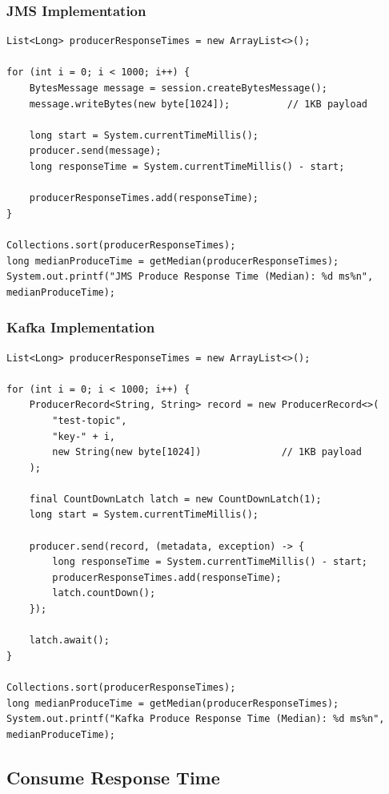 \documentclass[11pt,a4paper]{article}
\begin{document}
\subsubsection{JMS Implementation}
\begin{lstlisting}[style=javastyle, caption=JMS Producer Response Time Test]
List<Long> producerResponseTimes = new ArrayList<>();

for (int i = 0; i < 1000; i++) {
    BytesMessage message = session.createBytesMessage();
    message.writeBytes(new byte[1024]);          // 1KB payload
    
    long start = System.currentTimeMillis();
    producer.send(message);
    long responseTime = System.currentTimeMillis() - start;
    
    producerResponseTimes.add(responseTime);
}

Collections.sort(producerResponseTimes);
long medianProduceTime = getMedian(producerResponseTimes);
System.out.printf("JMS Produce Response Time (Median): %d ms%n", medianProduceTime);
\end{lstlisting}

\subsubsection{Kafka Implementation}
\begin{lstlisting}[style=javastyle, caption=Kafka Producer Response Time Test]
List<Long> producerResponseTimes = new ArrayList<>();

for (int i = 0; i < 1000; i++) {
    ProducerRecord<String, String> record = new ProducerRecord<>(
        "test-topic",
        "key-" + i,
        new String(new byte[1024])              // 1KB payload
    );
    
    final CountDownLatch latch = new CountDownLatch(1);
    long start = System.currentTimeMillis();
    
    producer.send(record, (metadata, exception) -> {
        long responseTime = System.currentTimeMillis() - start;
        producerResponseTimes.add(responseTime);
        latch.countDown();
    });
    
    latch.await();
}

Collections.sort(producerResponseTimes);
long medianProduceTime = getMedian(producerResponseTimes);
System.out.printf("Kafka Produce Response Time (Median): %d ms%n", medianProduceTime);
\end{lstlisting}

\subsection{Consume Response Time}
\end{document}
